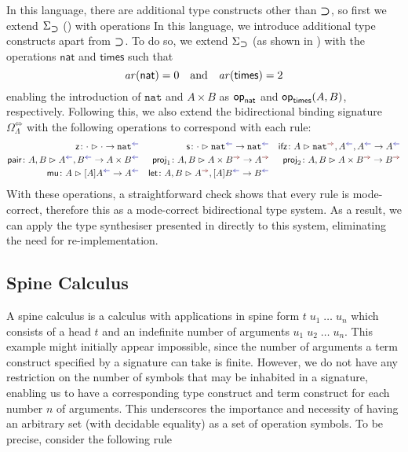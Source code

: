 In this language, there are additional type constructs other than $\mathbin{\bm{\supset}}$, so first we extend $\Sigma_{\mathbin{\bm{\supset}}}$ () with operations
In this language, we introduce additional type constructs apart from $\mathbin{\bm{\supset}}$.
To do so, we extend $\Sigma_{\mathbin{\bm{\supset}}}$ (as shown in ) with the operations $\mathsf{nat}$ and $\mathsf{times}$ such that
\[
  \mathit{ar}({\mathsf{nat}}) = 0 \quad\text{and}\quad \mathit{ar}({\mathsf{times}}) = 2
\]
enabling the introduction of $\mathtt{nat}$ and $A \times B$ as $\mathsf{op}_{\mathsf{nat}}$ and $\mathsf{op}_{\mathsf{times}}(A, B)$, respectively.
Following this, we also extend the bidirectional binding signature $\Omega_{\Lambda}^{\Leftrightarrow}$ with the following operations to correspond with each rule:
\begin{align*}
  \aritysymbol{\mathsf{z}}{\cdot}{\cdot}{\mathtt{nat}^{\chk}}
  && \aritysymbol{\mathsf{s}}{\cdot}{\mathtt{nat}^{\chk}}{\mathtt{nat}^{\chk}}
  && \aritysymbol{\mathsf{ifz}}{A}{\mathtt{nat}^{\syn}, A^{\chk}, A^{\chk}}{A^{\chk}} \\
  \aritysymbol{\mathsf{pair}}{A, B}{A^{\chk}, B^{\chk}}{A \times B^{\chk}}
  && \aritysymbol{\mathsf{proj}_1}{A, B}{A \times B^{\syn}}{A^{\syn}}
  && \aritysymbol{\mathsf{proj}_2}{A, B}{A \times B^{\syn}}{B^{\syn}} \\
  \aritysymbol{\mathsf{mu}}{A}{[A]A^{\chk}}{A^{\chk}}
  && \aritysymbol{\mathsf{let}}{A, B}{A^{\syn},[A]B^{\chk}}{B^{\chk}}
\end{align*}
With these operations, a straightforward check shows that every rule is mode-correct, therefore this as a mode-correct bidirectional type system.
As a result, we can apply the type synthesiser presented in  directly to this system, eliminating the need for re-implementation.

\subsection{Spine Calculus}\label{subsec:spine}

A spine calculus is a calculus with applications in spine form $t\;u_1\;\ldots\;u_n$ which consists of a head $t$ and an indefinite number of arguments $u_1\;u_2\;\dots\;u_n$.
This example might initially appear impossible, since the number of arguments a term construct specified by a signature can take  is finite.
However, we do not have any restriction on the number of symbols that may be inhabited in a signature, enabling us to have a corresponding type construct and term construct for each number $n$ of arguments.
This underscores the importance and necessity of having an arbitrary set (with decidable equality) as a set of operation symbols.
To be precise, consider the following rule

